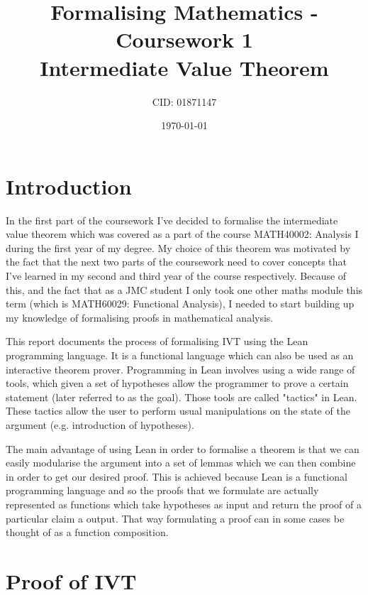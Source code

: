 \documentclass[11pt]{article}
\begin{document}
\title{Formalising Mathematics - Coursework 1 \\ Intermediate Value Theorem}
\date{\today}
\author{CID: 01871147}
\maketitle

\section*{ Introduction }

In the first part of the coursework I've decided to formalise the intermediate
value theorem which was covered as a part of the course MATH40002: Analysis I
during the first year of my degree. My choice of this theorem was motivated by
the fact that the next two parts of the coursework need to cover concepts that
I've learned in my second and third year of the course respectively. Because of
this, and the fact that as a JMC student I only took one other maths module this
term (which is MATH60029: Functional Analysis), I needed to start building up my
knowledge of formalising proofs in mathematical analysis.

This report documents the process of formalising IVT using the Lean programming
language. It is a functional language which can also be used as an interactive
theorem prover. Programming in Lean involves using a wide range of tools, which
given a set of hypotheses allow the programmer to prove a certain statement
(later referred to as the goal). Those tools are called "tactics" in Lean.
These tactics allow the user to perform usual manipulations on the state of the
argument (e.g. introduction of hypotheses).

The main advantage of using Lean in order to formalise a theorem is that we can
easily modularise the argument into a set of lemmas which we can then combine
in order to get our desired proof. This is achieved because Lean is a
functional programming language and so the proofs that we formulate are
actually represented as functions which take hypotheses as input and return the
proof of a particular claim a output. That way formulating a proof can in some
cases be thought of as a function composition.

\pagebreak

\section*{ Proof of IVT }
\end{document}
